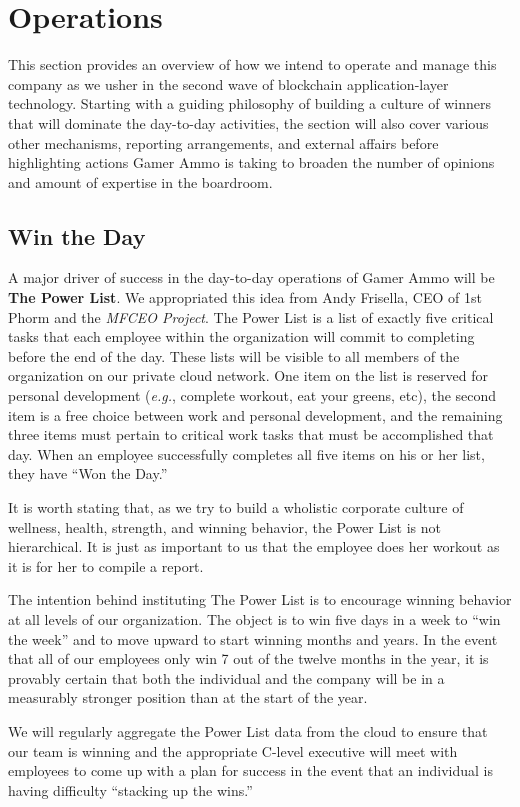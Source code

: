 \documentclass[11pt]{report}
\begin{document}
\chapter{Operations}
This section provides an overview of how we intend to operate and manage this company as we usher in the second wave of blockchain application-layer technology. Starting with a guiding philosophy of building a culture of winners that will dominate the day-to-day activities, the section will also cover various other mechanisms, reporting arrangements, and external affairs before highlighting actions Gamer Ammo is taking to broaden the number of opinions and amount of expertise in the boardroom.
\section{Win the Day}
A major driver of success in the day-to-day operations of Gamer Ammo will be \textbf{The Power List}. We appropriated this idea from Andy Frisella, CEO of 1st Phorm and the \textit{MFCEO Project}\cite{power-list}. The Power List is a list of exactly five critical tasks that each employee within the organization will commit to completing before the end of the day. These lists will be visible to all members of the organization on our private cloud network. One item on the list is reserved for personal development (\textit{e.g.}, complete workout, eat your greens, etc), the second item is a free choice between work and personal development, and the remaining three items must pertain to critical work tasks that must be accomplished that day. When an employee successfully completes all five items on his or her list, they have ``Won the Day.''

It is worth stating that, as we try to build a wholistic corporate culture of wellness, health, strength, and winning behavior, the Power List is not hierarchical. It is just as important to us that the employee does her workout as it is for her to compile a report.

The intention behind instituting The Power List is to encourage winning behavior at all levels of our organization. The object is to win five days in a week to ``win the week'' and to move upward to start winning months and years. In the event that all of our employees only win 7 out of the twelve months in the year, it is provably certain that both the individual and the company will be in a measurably stronger position than at the start of the year. 

We will regularly aggregate the Power List data from the cloud to ensure that our team is winning and the appropriate C-level executive will meet with employees to come up with a plan for success in the event that an individual is having difficulty ``stacking up the wins.''
\end{document}
